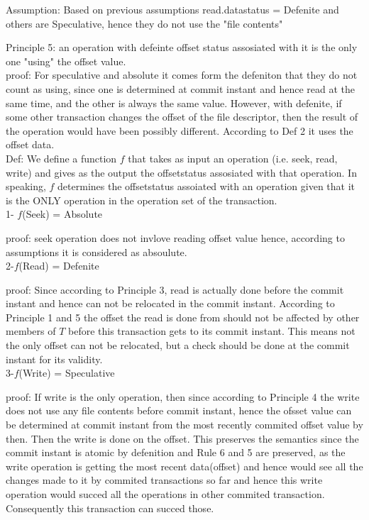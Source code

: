 \documentclass[a4paper, 11pt]{article}
\begin{document}
Assumption: Based on previous assumptions read.datastatus = Defenite and others are Speculative, hence they do not use the "file contents"

Principle 5: an operation with defeinte offset status assosiated with it is the only one "using" the offset value.\\

proof: For speculative and absolute it comes form the defeniton that they do not count as using, since one is determined at commit instant and hence read at the same time, and the other is always the same value. However, with defenite, if some other transaction changes the offset of the file descriptor, then the result of the operation would have been possibly different. According to Def 2 it uses the offset data.\\ 




Def: We define a function $f$ that takes as input an operation (i.e. seek, read, write) and gives as the output the offsetstatus assosiated with that operation. In speaking, $f$ determines the offsetstatus assoiated with an operation given that it is the ONLY operation in the operation set of the transaction. \\

1- $f$(Seek) = Absolute 

proof: seek operation does not invlove reading offset value hence, according to assumptions it is considered as absoulute.\\

2-$f$(Read) = Defenite

proof: Since according to Principle 3, read is actually done before the commit instant and hence can not be relocated in the commit instant. According to Principle 1 and 5 the offset the read is done from should not be affected by other members of $T$ before this transaction gets to its commit instant. This means not the only offset can not be relocated, but a check should be done at the commit instant for its validity.\\

3-$f$(Write) = Speculative

proof: If write is the only operation, then since according to Principle 4 the write does not use any file contents before commit instant, hence the ofsset value can be determined at commit instant from the most recently commited offset value by then. Then the write is done on the offset. This preserves the semantics since the commit instant is atomic by defenition and Rule 6 and 5 are preserved, as the write operation is getting the most recent data(offset) and hence would see all the changes made to it by commited transactions so far and hence this write operation would succed all the operations in other commited transaction. Consequently this transaction can succed those.\\   
\end{document}

